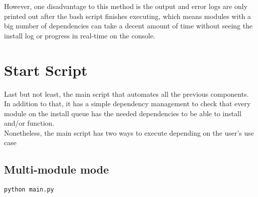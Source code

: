 However, one disadvantage to this method is the output and error logs are only printed out after the bash script finishes executing, which means modules with a big number of dependencies can take a decent amount of time without seeing the install log or progress in real-time on the console.\\


\section{Start Script}
Last but not least, the main script that automates all the previous components.\\
In addition to that, it has a simple dependency management to check that every module on the install queue has the needed dependencies to be able to install and/or function.\\
Nonetheless, the main script has two ways to execute depending on the user’s use case

\subsection{Multi-module mode}
\begin{lstlisting}[caption=Multi-module command, style=pythonstyle]
python main.py
\end{lstlisting}


